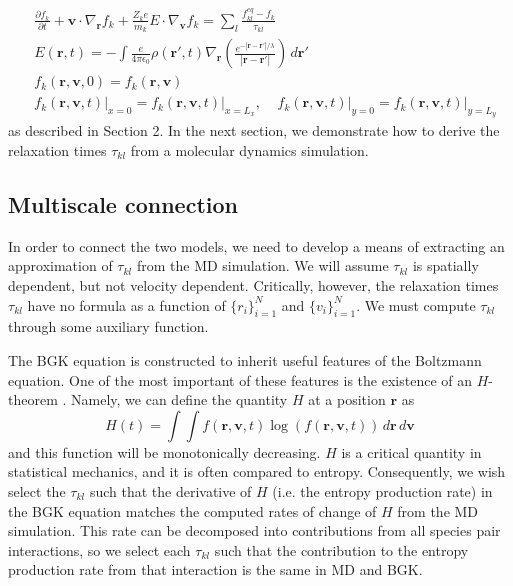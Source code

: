 \documentclass{article}
\begin{document}
\begin{equation*}
\begin{split}
&\frac{\partial f_k}{\partial t}+\mathbf{v}\cdot\nabla_\mathbf{r}f_k+\frac{Z_ke}{m_k}E\cdot\nabla_\mathbf{v}f_k=\sum_l\frac{f_{kl}^{eq}-f_k}{\tau_{kl}}\\
&E(\mathbf{r},t)=-\int\frac{e}{4\pi\epsilon_0}\rho(\mathbf{r}',t)\nabla_\mathbf{r}\left(\frac{e^{-|\mathbf{r}-\mathbf{r}'|/\lambda}}{|\mathbf{r}-\mathbf{r}'|}\right)\,d\mathbf{r}'\\
&f_k(\mathbf{r},\mathbf{v},0)=f_{k}(\mathbf{r},\mathbf{v})\\
&\left.f_k(\mathbf{r},\mathbf{v},t)\right|_{x=0}=\left.f_{k}(\mathbf{r},\mathbf{v},t)\right|_{x=L_x},\;\;\;\;
\left.f_k(\mathbf{r},\mathbf{v},t)\right|_{y=0}=\left.f_{k}(\mathbf{r},\mathbf{v},t)\right|_{y=L_y}
\end{split}
\end{equation*}as described in Section 2. In the next section, we demonstrate how to derive the relaxation times $\tau_{kl}$ from a molecular dynamics simulation.

\subsection{Multiscale connection}

In order to connect the two models, we need to develop a means of extracting an approximation of $\tau_{kl}$ from the MD simulation. We will assume $\tau_{kl}$ is spatially dependent, but not velocity dependent. Critically, however, the relaxation times $\tau_{kl}$ have no formula as a function of $\{r_i\}_{i=1}^N$ and $\{v_i\}_{i=1}^N$. We must compute $\tau_{kl}$ through some auxiliary function.

The BGK equation is constructed to inherit useful features of the Boltzmann equation. One of the most important of these features is the existence of an $H$-theorem \cite{struchtrup2005macroscopic}. Namely, we can define the quantity $H$ at a position $\mathbf{r}$ as 
\begin{equation}
H(t)= \int \int f(\mathbf{r},\mathbf{v},t)\log(f(\mathbf{r},\mathbf{v},t))\,d\mathbf{r}\,d\mathbf{v}
\end{equation}and this function will be monotonically decreasing. $H$ is a critical quantity in statistical mechanics, and it is often compared to entropy. Consequently, we wish select the $\tau_{kl}$ such that the derivative of $H$ (i.e. the entropy production rate) in the BGK equation matches the computed rates of change of $H$ from the MD simulation. This rate can be decomposed into contributions from all species pair interactions, so we select each $\tau_{kl}$ such that the contribution to the entropy production rate from that interaction is the same in MD and BGK.
\end{document}
